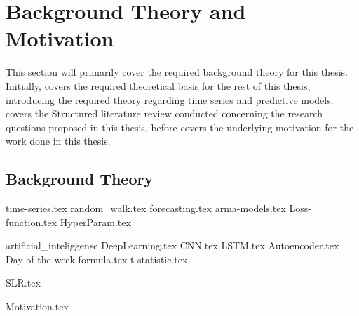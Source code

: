 \chapter{Background Theory and Motivation}\label{T-B}
\label{cha:TheoryAndBackground}


This section will primarily cover the required background theory for this thesis.
Initially,  covers the required theoretical basis for the rest of this thesis,
introducing the required theory regarding time series and predictive models.
 covers the Structured literature review conducted concerning the research questions proposed in this thesis,
before  covers the underlying motivation for the work done in this thesis.



\section{Background Theory}
\label{section:BT:BackgroundTheory}
{time-series.tex}
{random_walk.tex}
{forecasting.tex}
{arma-models.tex}
{Loss-function.tex}
{HyperParam.tex}

{artificial_inteliggense}
{DeepLearning.tex}
{CNN.tex}
{LSTM.tex}
{Autoencoder.tex}
{Day-of-the-week-formula.tex}
{t-statistic.tex}



{SLR.tex}


{Motivation.tex}
